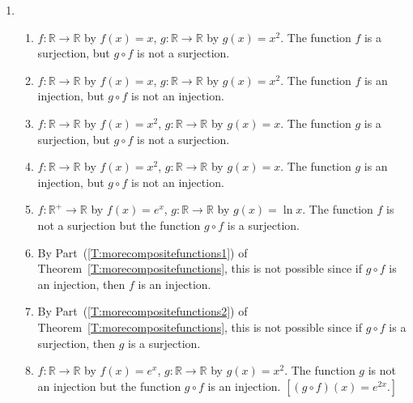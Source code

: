 \begin{enumerate}
\item \begin{enumerate}
\item $f: \mathbb{R} \to \mathbb{R}$ by $f \left( x \right) = x$, 
$g: \mathbb{R} \to \mathbb{R}$ by $g \left( x \right) = x^2$.  The function $f$ is a surjection, but $g \circ f$ is not a surjection.

\item $f: \mathbb{R} \to \mathbb{R}$ by $f \left( x \right) = x$, 
$g: \mathbb{R} \to \mathbb{R}$ by $g \left( x \right) = x^2$.  The function $f$ is an injection, but $g \circ f$ is not an injection.

\item $f: \mathbb{R} \to \mathbb{R}$ by $f \left( x \right) = x^2$, 
$g: \mathbb{R} \to \mathbb{R}$ by $g \left( x \right) = x$.  The function $g$ is a surjection, but $g \circ f$ is not a surjection.

\item $f: \mathbb{R} \to \mathbb{R}$ by $f \left( x \right) = x^2$, 
$g: \mathbb{R} \to \mathbb{R}$ by $g \left( x \right) = x$.  The function $g$ is an injection, but $g \circ f$ is not an injection.

\item $f:\mathbb{R}^+ \to \mathbb{R}$ by $f \left( x \right) = e^x$, 
$g:\mathbb{R} \to \mathbb{R}$ by $g \left( x \right) = \ln x$.  The function $f$ is not a surjection but the function $g \circ f$ is a surjection.

\item By Part~(\ref{T:morecompositefunctions1}) of Theorem~\ref{T:morecompositefunctions}, this is not possible since if $g \circ f$ is an injection, then $f$ is an injection.

\item By Part~(\ref{T:morecompositefunctions2}) of Theorem~\ref{T:morecompositefunctions}, this is not possible since if $g \circ f$ is a surjection, then $g$ is a surjection.

\item $f:\mathbb{R} \to \mathbb{R}$ by $f \left( x \right) = e^x$, 
$g:\mathbb{R} \to \mathbb{R}$ by $g \left( x \right) = x^2$.  The function $g$ is not an injection but the function $g \circ f$ is an injection. 
$\left[ \left( g \circ f \right) \left( x \right) = e^{2x}.\right]$
\end{enumerate}




\end{enumerate}
